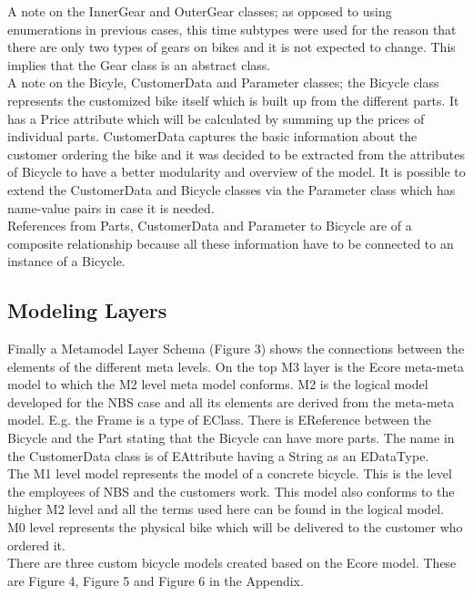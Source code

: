 \noindent A note on the InnerGear and OuterGear classes; as opposed 
to using enumerations in previous cases, this time subtypes were used 
for the reason that there are only two types of gears on bikes and 
it is not expected to change. This implies that the Gear class is an 
abstract class.\\

\noindent A note on the Bicyle, CustomerData and Parameter classes; 
the Bicycle class represents the customized bike itself which is 
built up from the different parts. It has a Price attribute which 
will be calculated by summing up the prices of individual parts. 
CustomerData captures the basic information about the customer 
ordering the bike and it was decided to be extracted from the 
attributes of Bicycle to have a better modularity and overview of 
the model. It is possible to extend the CustomerData and Bicycle 
classes via the Parameter class which has name-value pairs in case 
it is needed.\\

\noindent References from Parts, CustomerData and Parameter to Bicycle 
are of a composite relationship because all these information have to 
be connected to an instance of a Bicycle.\\

\subsection{Modeling Layers}

\noindent Finally a Metamodel Layer Schema (Figure 3) shows the connections
between the elements of the different meta levels. On the top M3 layer is
the Ecore meta-meta model to which the M2 level meta model conforms. 
M2 is the logical model developed for the NBS case and all its elements are
derived from the meta-meta model. E.g. the Frame is a type of EClass. There is 
EReference between the Bicycle and the Part stating that the Bicycle can have
more parts. The name in the CustomerData class is of EAttribute having a 
String as an EDataType.\\
The M1 level model represents the model of a concrete bicycle. This is 
the level the employees of NBS and the customers work. This model also
conforms to the higher M2 level and all the terms used here can be found 
in the logical model.\\
M0 level represents the physical bike which will be delivered to the
customer who ordered it.\\
There are three custom bicycle models created based on the Ecore model. These
are Figure 4, Figure 5 and Figure 6 in the Appendix.
